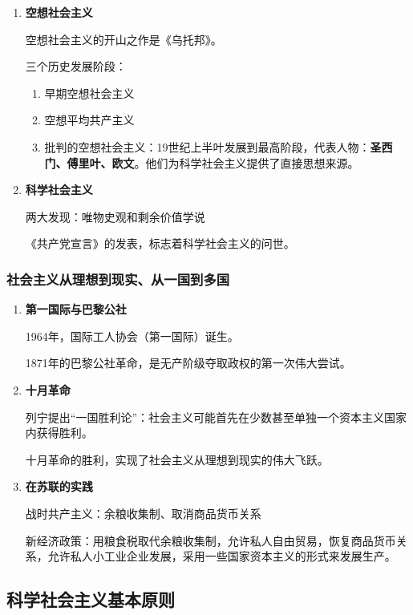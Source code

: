 \documentclass[12pt, a4paper, oneside]{ctexart}
\begin{document}
\begin{enumerate}
  \item {\bf 空想社会主义}
  
  空想社会主义的开山之作是《乌托邦》。
  
  三个历史发展阶段：
  \begin{enumerate}
    \item 早期空想社会主义
    \item 空想平均共产主义
    \item 批判的空想社会主义：19世纪上半叶发展到最高阶段，代表人物：\textbf{圣西门、傅里叶、欧文}。他们为科学社会主义提供了直接思想来源。
  \end{enumerate}

  \item {\bf 科学社会主义}
  
  两大发现：唯物史观和剩余价值学说

  《共产党宣言》的发表，标志着科学社会主义的问世。

\end{enumerate}

\subsubsection{社会主义从理想到现实、从一国到多国}

\begin{enumerate}
  \item {\bf 第一国际与巴黎公社}
  
  1964年，国际工人协会（第一国际）诞生。

  1871年的巴黎公社革命，是无产阶级夺取政权的第一次伟大尝试。

  \item {\bf 十月革命}
  
  列宁提出“一国胜利论”：社会主义可能首先在少数甚至单独一个资本主义国家内获得胜利。

  十月革命的胜利，实现了社会主义从理想到现实的伟大飞跃。

  \item {\bf 在苏联的实践}
  
  战时共产主义：余粮收集制、取消商品货币关系

  新经济政策：用粮食税取代余粮收集制，允许私人自由贸易，恢复商品货币关系，允许私人小工业企业发展，采用一些国家资本主义的形式来发展生产。

\end{enumerate}

\subsection{科学社会主义基本原则}
\end{document}
